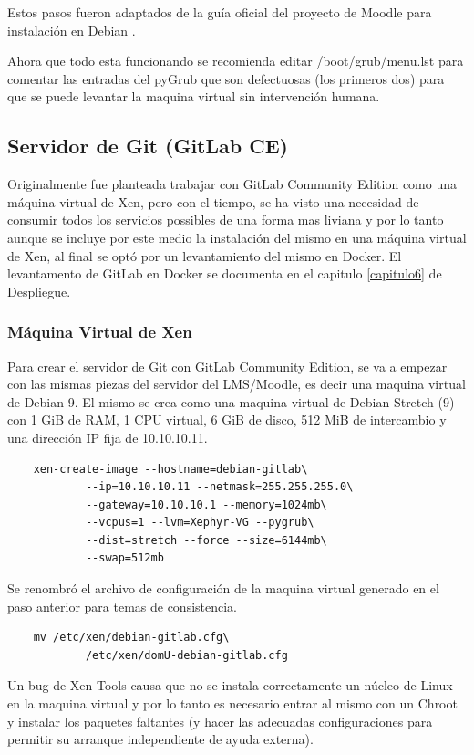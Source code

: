 Estos pasos fueron adaptados de la guía oficial del proyecto de Moodle para instalación en Debian \citep{MOODLE-Install-Debian}.

Ahora que todo esta funcionando se recomienda editar /boot/grub/menu.lst para comentar las entradas del pyGrub que son defectuosas (los primeros dos) para que se puede levantar la maquina virtual sin intervención humana.

 
\subsection{Servidor de Git (GitLab CE)}
Originalmente fue planteada trabajar con GitLab Community Edition como una máquina virtual de Xen, pero con el tiempo, se ha visto una necesidad de consumir todos los servicios possibles de una forma mas liviana y por lo tanto aunque se incluye por este medio la instalación del mismo en una máquina virtual de Xen, al final se optó por un levantamiento del mismo en Docker. El levantamento de GitLab en Docker se documenta en el capitulo \ref{capitulo6} de Despliegue.

\subsubsection{Máquina Virtual de Xen}
Para crear el servidor de Git con GitLab Community Edition, se va a empezar con las mismas piezas del servidor del LMS/Moodle, es decir una maquina virtual de Debian 9. El mismo se crea como una maquina virtual de Debian Stretch (9) con 1 GiB de RAM, 1 CPU virtual, 6 GiB de disco, 512 MiB de intercambio y una dirección IP fija de 10.10.10.11.
\begin{lstlisting}
	xen-create-image --hostname=debian-gitlab\
    		--ip=10.10.10.11 --netmask=255.255.255.0\
        	--gateway=10.10.10.1 --memory=1024mb\
        	--vcpus=1 --lvm=Xephyr-VG --pygrub\
        	--dist=stretch --force --size=6144mb\
        	--swap=512mb
\end{lstlisting}

Se renombró el archivo de configuración de la maquina virtual generado en el paso anterior para temas de consistencia.

\begin{lstlisting}
	mv /etc/xen/debian-gitlab.cfg\
    		/etc/xen/domU-debian-gitlab.cfg
\end{lstlisting}

Un bug de Xen-Tools causa que no se instala correctamente un núcleo de Linux en la maquina virtual y por lo tanto es necesario entrar al mismo con un Chroot y instalar los paquetes faltantes (y hacer las adecuadas configuraciones  para permitir su arranque independiente de ayuda externa).

